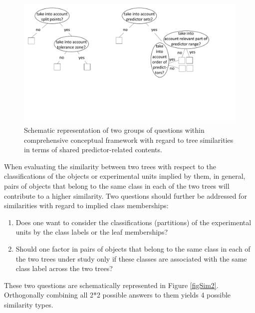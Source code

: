 \begin{figure}[H]
	\centering
	\includegraphics[width=\linewidth, trim=0 7cm 0 0, clip]{sim2.pdf}
	\caption{Schematic representation of two groups of questions within comprehensive conceptual framework with regard to tree similarities in terms of shared predictor-related contents.}
	\label{figSim1}
\end{figure}

When evaluating the similarity between two trees with respect to the classifications of the objects or experimental units implied by them, in general, pairs of objects that belong to the same class in each of the two trees will contribute to a higher similarity. Two questions should further be addressed for similarities with regard to implied class memberships:
\begin{enumerate}
\item{Does one want to consider the classifications (partitions) of the experimental units by the class labels or the leaf memberships?}
\item{Should one factor in pairs of objects that belong to the same class in each of the two trees under study only if these classes are associated with the same class label across the two trees?}
\end{enumerate}
These two questions are schematically represented in Figure \ref{figSim2}. Orthogonally combining all 2*2 possible answers to them yields 4 possible similarity types.


